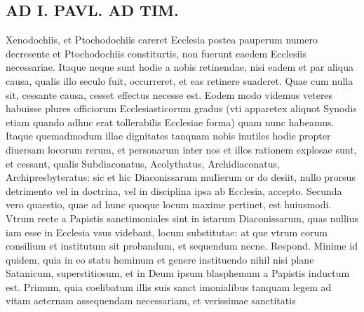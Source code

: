 \documentclass{article}
\begin{document}
\begin{pages}
\section*{AD I. PAVL. AD TIM. }
\marginpar{[ p.290 ]}\pstart Xenodochiis, et Ptochodochiis careret Ecclesia postea pauperum numero decresente et Ptochodochiis constiturtis, non fuerunt eaedem Ecclesiis necessariae. Itaque neque sunt hodie a nobis retinendae, nisi eadem et par aliqua causa, qualis illo seculo fuit, occurreret, et eas retinere suaderet. Quae cum nulla sit, cessante causa, cesset effectus necesse est. Eodem modo videmus veteres habuisse plures officiorum Ecclesiasticorum gradus (vti apparetex aliquot Synodis etiam quando adhuc erat tollerabilis Ecclesiae forma) quam nunc habeamus. Itaque quemadmodum illae dignitates tanquam nobis inutiles hodie propter diuersam locorum rerum, et personarum inter nos et illos rationem explosae sunt, et cessant, qualis Subdiaconatus, Acolythatus, Archidiaconatus, Archipresbyteratus: sic et hic Diaconissarum muIierum or do desiit, nullo prorsus detrimento vel in doctrina, vel in disciplina ipsa ab Ecclesia, accepto. Secunda vero quaestio, quae ad hunc quoque locum maxime pertinet, est huiusmodi. Vtrum recte a Papistis sanctimoniales sint in istarum Diaconissarum, quas nullius iam esse in Ecclesia vsus videbant, locum substitutae: at que vtrum eorum consilium et institutum sit probandum, et sequendum necne. Respond. Minime id quidem, quia in eo statu hominum et genere instituendo nihil nisi plane Satanicum, superstitiosum, et in Deum ipsum blasphemum a Papistis inductum est. Primum, quia coelibatum illis suis sanct imonialibus tanquam legem ad vitam aeternam assequendam necessariam, et verissimae sanctitatis  \pend

\end{pages}
\end{document}
